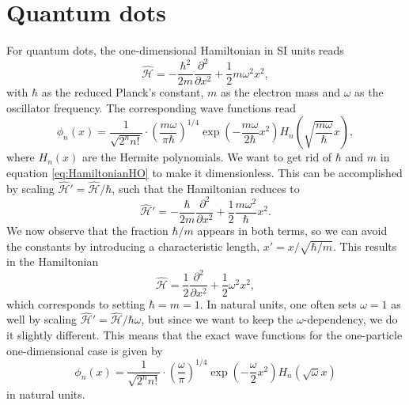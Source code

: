 \section{Quantum dots}
For quantum dots, the one-dimensional Hamiltonian in SI units reads
\begin{equation}
\hat{\mathcal{H}}=-\frac{\hbar^2}{2m}\frac{\partial^2}{\partial x^2}+\frac{1}{2}m\omega^2x^2,
\label{eq:HamiltonianHO}
\end{equation}
with $\hbar$ as the reduced Planck's constant, $m$ as the electron mass and $\omega$ as the oscillator frequency. The corresponding wave functions read
\begin{equation}
\phi_n(x)=\frac{1}{\sqrt{2^nn!}}\cdot\left(\frac{m\omega}{\pi\hbar}\right)^{1/4}\exp(-\frac{m\omega}{2\hbar}x^2)H_n\left(\sqrt{\frac{m\omega}{\hbar}}x\right),
\end{equation}
where $H_n(x)$ are the Hermite polynomials. We want to get rid of $\hbar$ and $m$ in equation \eqref{eq:HamiltonianHO} to make it dimensionless. This can be accomplished by scaling  $\hat{\mathcal{H}}'= \hat{\mathcal{H}}/\hbar$, such that the Hamiltonian reduces to
\begin{equation}
\hat{\mathcal{H}}'=-\frac{\hbar}{2m}\frac{\partial^2}{\partial x^2}+\frac{1}{2}\frac{m\omega^2}{\hbar}x^2.
\end{equation}
We now observe that the fraction $\hbar/m$ appears in both terms, so we can avoid the constants by introducing a characteristic length, $x'= x/\sqrt{\hbar/m}$. This results in the  Hamiltonian 
\begin{equation}
\hat{\mathcal{H}}=\frac{1}{2}\frac{\partial^2}{\partial x^2}+\frac{1}{2}\omega^2x^2,
\end{equation}
which corresponds to setting $\hbar=m=1$. In natural units, one often sets $\omega=1$ as well by scaling $\hat{\mathcal{H}}'=\hat{\mathcal{H}}/\hbar\omega$, but since we want to keep the $\omega$-dependency, we do it slightly different. This means that the exact wave functions for the one-particle one-dimensional case is given by
\begin{equation}
\phi_n(x)=\frac{1}{\sqrt{2^nn!}}\cdot\left(\frac{\omega}{\pi}\right)^{1/4}\exp(-\frac{\omega}{2}x^2)H_n(\sqrt{\omega}x)
\end{equation} 
in natural units.

